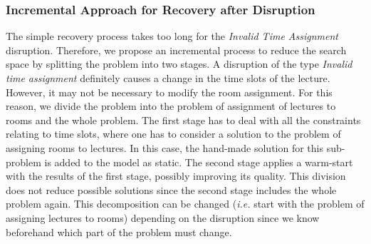 \documentclass[runningheads]{llncs}
\begin{document}
\begin{table}[t]
\caption{Results for the most common disruptions using the \textsc{mixed} model. TO stands for time out, and  $\delta$ COM measures the change in the optimal value. }
\label{tab:recovery}
\centering
{}
\vspace{-.5cm}
\end{table}
\vspace{-1.5cm}


\subsubsection{Incremental Approach for Recovery after Disruption}

The simple recovery process takes too long for the \textit{Invalid Time Assignment} disruption. Therefore, we propose an incremental process to reduce the search space by splitting the problem into two stages.  A disruption of the type \textit{Invalid time assignment} definitely causes a change in the time slots of the lecture. However, it may not be necessary to modify the room assignment. For this reason, we divide the problem into the problem of assignment of lectures to rooms and the whole problem. The first stage has to deal with all the constraints relating to time slots, where one has to consider a solution to the problem of assigning rooms to lectures. In this case, the hand-made solution for this sub-problem is added to the model as static. The second stage applies a warm-start with the results of the first stage, possibly improving its quality. This division does not reduce possible solutions since the second stage includes the whole problem again. This decomposition can be changed (\emph{i.e.} start with the problem of assigning lectures to rooms) depending on the disruption since we know beforehand which part of the problem must change. 
\end{document}
